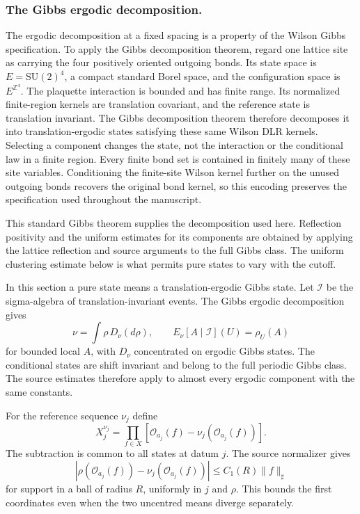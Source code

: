 \documentclass[11pt,letterpaper,reqno]{amsart}
\theoremstyle{definition}
\theoremstyle{remark}
\newcommand{\SU}{\mathrm{SU}}
\newcommand{\cO}{\mathcal O}
\begin{document}
\subsubsection*{The Gibbs ergodic decomposition.}
\label{hyp:gibbs-decomposition}
The ergodic decomposition at a fixed spacing is a property of the
Wilson Gibbs specification. To apply the Gibbs decomposition theorem,
regard one lattice site as carrying the four positively oriented
outgoing bonds. Its state space is $E=\SU(2)^4$, a compact standard
Borel space, and the configuration space is $E^{\mathbb Z^4}$. The
plaquette interaction is bounded and has finite range. Its normalized
finite-region kernels are translation covariant, and the reference
state is translation invariant. The Gibbs decomposition theorem
\cite[Theorem~14.17, p.~298]{Georgii2011} therefore decomposes it
into translation-ergodic states satisfying
these same Wilson DLR kernels. Selecting a component changes the
state, not the interaction or the conditional law in a finite region.
Every finite bond set is contained in finitely many of these site
variables. Conditioning the finite-site Wilson kernel further on the
unused outgoing bonds recovers the original bond kernel, so this
encoding preserves the specification used throughout the manuscript.

This standard Gibbs theorem supplies the decomposition used here.
Reflection positivity and the uniform estimates for its components
are obtained by applying the lattice reflection and source arguments
to the full Gibbs class. The uniform clustering estimate below is
what permits pure states to vary with the cutoff.

In this section a pure state means a translation-ergodic Gibbs state.
Let $\mathcal I$ be the sigma-algebra of translation-invariant events.
The Gibbs ergodic decomposition gives
\[
 \nu=\int\rho\,D_\nu(d\rho),\qquad
 E_\nu[A\mid\mathcal I](U)=\rho_U(A)
\]
for bounded local $A$, with $D_\nu$ concentrated on ergodic Gibbs states.
The conditional states are shift invariant and belong to the full
periodic Gibbs class. The source estimates therefore apply to almost
every ergodic component with the same constants.

For the reference sequence $\nu_j$ define
\begin{equation}\label{eq:phase-centring}
 X_j^{\nu_j}=\prod_{f\in X}
       [\cO_{a_j}(f)-\nu_j(\cO_{a_j}(f))].
\end{equation}
The subtraction is common to all states at datum $j$. The source
normalizer gives
\begin{equation}\label{eq:phase-mean-bound}
 |\rho(\cO_{a_j}(f))-\nu_j(\cO_{a_j}(f))|
       \le C_1(R)\|f\|_\sharp
\end{equation}
for support in a ball of radius $R$, uniformly in $j$ and $\rho$.
This bounds the first coordinates even when the two uncentred means
diverge separately.
\end{document}
